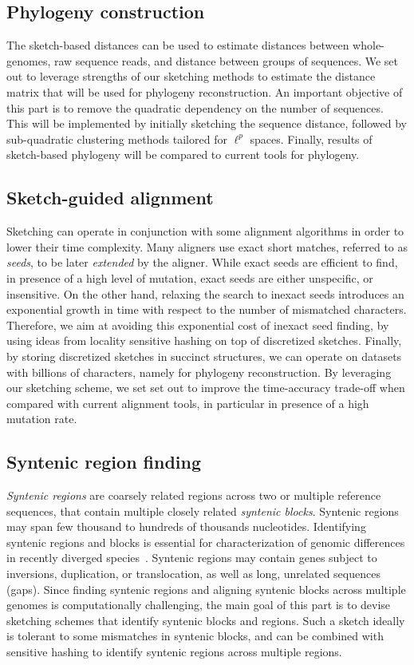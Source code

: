 \subsection{Phylogeny construction} The sketch-based distances can be used to estimate distances between whole-genomes, raw sequence reads, and distance between groups of sequences. We set out to leverage strengths of our sketching methods to estimate the distance matrix that will be used for phylogeny reconstruction. An important objective of this part is to remove the quadratic dependency on the number of sequences. This will be implemented by initially sketching the sequence distance, followed by sub-quadratic clustering methods tailored for $\ell^p$ spaces. Finally, results of sketch-based phylogeny will be compared to current tools for phylogeny. 

\subsection{Sketch-guided alignment}
Sketching can operate in conjunction with some alignment algorithms in order to lower their time complexity. Many aligners use exact short matches, referred to as \emph{seeds}, to be later \emph{extended} by the aligner. While exact seeds are efficient to find, in presence of a high level of mutation, exact seeds are either unspecific, or insensitive. On the other hand, relaxing the search to inexact seeds introduces an exponential growth in time with respect to the number of mismatched characters. Therefore, we aim at avoiding this exponential cost of inexact seed finding, by using ideas from locality sensitive hashing on top of discretized sketches. Finally, by storing discretized sketches in succinct structures, we can operate on datasets with billions of characters, namely for phylogeny reconstruction. By leveraging our sketching scheme, we set set out to improve the time-accuracy trade-off when compared with current alignment tools, in particular in presence of a high mutation rate.  

 

\subsection{Syntenic region finding}
\emph{Syntenic regions} are coarsely related regions across two or multiple reference sequences, that contain multiple closely related \emph{syntenic blocks}. 
Syntenic regions may span few thousand to hundreds of thousands nucleotides. 
Identifying syntenic regions and blocks is essential for characterization of genomic differences in recently diverged species~\cite{vergara2010large}. 
Syntenic regions may contain genes subject to inversions, duplication, or translocation, as well as long, unrelated sequences (gaps). Since finding syntenic regions and aligning syntenic blocks across multiple genomes is computationally challenging, the main goal of this part is to devise sketching schemes that identify syntenic blocks and regions. 
Such a sketch ideally is tolerant to some mismatches in syntenic blocks, and can be combined with sensitive hashing to identify  syntenic regions across multiple regions. 

